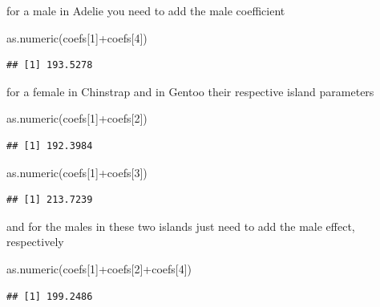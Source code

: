 \documentclass[
]{book}
\newenvironment{Shaded}{\begin{snugshade}}{\end{snugshade}}
\newcommand{\DecValTok}[1]{\textcolor[rgb]{0.00,0.00,0.81}{#1}}
\newcommand{\FunctionTok}[1]{\textcolor[rgb]{0.00,0.00,0.00}{#1}}
\newcommand{\NormalTok}[1]{#1}
\newcommand{\SpecialCharTok}[1]{\textcolor[rgb]{0.00,0.00,0.00}{#1}}
\begin{document}
for a male in Adelie you need to add the male coefficient

\begin{Shaded}
\begin{Highlighting}[]
\FunctionTok{as.numeric}\NormalTok{(coefs[}\DecValTok{1}\NormalTok{]}\SpecialCharTok{+}\NormalTok{coefs[}\DecValTok{4}\NormalTok{])}
\end{Highlighting}
\end{Shaded}

\begin{verbatim}
## [1] 193.5278
\end{verbatim}

for a female in Chinstrap and in Gentoo their respective island parameters

\begin{Shaded}
\begin{Highlighting}[]
\FunctionTok{as.numeric}\NormalTok{(coefs[}\DecValTok{1}\NormalTok{]}\SpecialCharTok{+}\NormalTok{coefs[}\DecValTok{2}\NormalTok{])}
\end{Highlighting}
\end{Shaded}

\begin{verbatim}
## [1] 192.3984
\end{verbatim}

\begin{Shaded}
\begin{Highlighting}[]
\FunctionTok{as.numeric}\NormalTok{(coefs[}\DecValTok{1}\NormalTok{]}\SpecialCharTok{+}\NormalTok{coefs[}\DecValTok{3}\NormalTok{])}
\end{Highlighting}
\end{Shaded}

\begin{verbatim}
## [1] 213.7239
\end{verbatim}

and for the males in these two islands just need to add the male effect, respectively

\begin{Shaded}
\begin{Highlighting}[]
\FunctionTok{as.numeric}\NormalTok{(coefs[}\DecValTok{1}\NormalTok{]}\SpecialCharTok{+}\NormalTok{coefs[}\DecValTok{2}\NormalTok{]}\SpecialCharTok{+}\NormalTok{coefs[}\DecValTok{4}\NormalTok{])}
\end{Highlighting}
\end{Shaded}

\begin{verbatim}
## [1] 199.2486
\end{verbatim}
\end{document}
